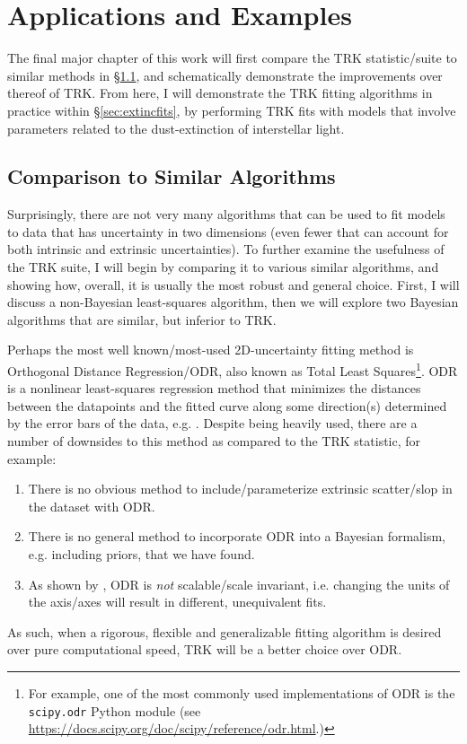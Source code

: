 \chapter{Applications and Examples}
\label{cha:applic}
The final major chapter of this work will first compare the TRK statistic/suite to similar methods in \S\ref{sec:compare}, and schematically demonstrate the improvements over thereof of TRK. From here, I will demonstrate the TRK fitting algorithms in practice within \S\ref{sec:extincfits}, by performing TRK fits with models that involve parameters related to the dust-extinction of interstellar light.
\section{Comparison to Similar Algorithms}
\label{sec:compare}
Surprisingly, there are not very many algorithms that can be used to fit models to data that has uncertainty in two dimensions (even fewer that can account for both intrinsic and extrinsic uncertainties). To further examine the usefulness of the TRK suite, I will begin by comparing it to various similar algorithms, and showing how, overall, it is usually the most robust and general choice. First, I will discuss a non-Bayesian least-squares algorithm, then we will explore two Bayesian algorithms that are similar, but inferior to TRK.

Perhaps the most well known/most-used 2D-uncertainty fitting method is Orthogonal Distance Regression/ODR, also known as Total Least Squares\footnote{For example, one of the most commonly used implementations of ODR is the \texttt{scipy.odr} Python module (see \url{https://docs.scipy.org/doc/scipy/reference/odr.html}.)}. ODR is a nonlinear least-squares regression method that minimizes the distances between the datapoints and the fitted curve along some direction(s) determined by the error bars of the data, e.g. \textcite{brown1990odr}. Despite being heavily used, there are a number of downsides to this method as compared to the TRK statistic, for example:
\begin{enumerate}
    \item There is no obvious method to include/parameterize extrinsic scatter/slop in the dataset with ODR.
    \item There is no general method to incorporate ODR into a Bayesian formalism, e.g. including priors, that we have found.
    \item As shown by \textcite{odrscale}, ODR is \textit{not} scalable/scale invariant, i.e. changing the units of the axis/axes will result in different, unequivalent fits.
\end{enumerate}
As such, when a rigorous, flexible and generalizable fitting algorithm is desired over pure computational speed, TRK will be a better choice over ODR.

